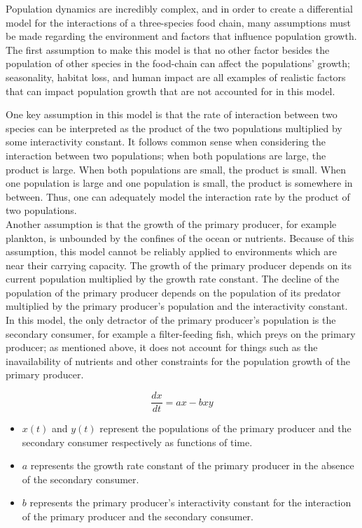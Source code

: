 \documentclass[11pt,oneside]{article}
\begin{document}
	Population dynamics are incredibly complex, and in order to create a differential model for the interactions of a three-species food chain, many assumptions must be made regarding the environment and factors that influence population growth. The first assumption to make this model is that no other factor besides the population of other species in the food-chain can affect the populations' growth; seasonality, habitat loss, and human impact are all examples of realistic factors that can impact population growth that are not accounted for in this model.
	
	One key assumption in this model is that the rate of interaction between two species can be interpreted as the product of the two populations multiplied by some interactivity constant. It follows common sense when considering the interaction between two populations; when both populations are large, the product is large. When both populations are small, the product is small. When one population is large and one population is small, the product is somewhere in between. Thus, one can adequately model the interaction rate by the product of two populations.\\
	
	Another assumption is that the growth of the primary producer, for example plankton, is unbounded by the confines of the ocean or nutrients. Because of this assumption, this model cannot be reliably applied to environments which are near their carrying capacity. The growth of the primary producer depends on its current population multiplied by the growth rate constant. The decline of the population of the primary producer depends on the population of its predator multiplied by the primary producer's population and the interactivity constant. In this model, the only detractor of the primary producer's population is the secondary consumer, for example a filter-feeding fish, which preys on the primary producer; as mentioned above, it does not account for things such as the inavailability of nutrients and other constraints for the population growth of the primary producer.
	
	\begin{equation}
	\frac{dx}{dt} = ax - bxy
	\end{equation}
	\begin{itemize}
		\item $x(t)$ and $y(t)$ represent the populations of the primary producer and the secondary consumer respectively as functions of time.
		\item $a$ represents the growth rate constant of the primary producer in the absence of the secondary consumer.
		\item $b$ represents the primary producer's interactivity constant for the interaction of the primary producer and the secondary consumer.
	\end{itemize}
	
\end{document}
